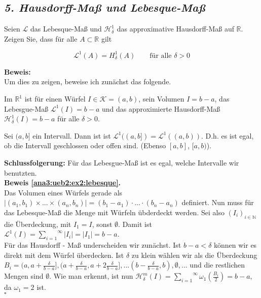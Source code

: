 \subsection*{\itshape 5. Hausdorff-Maß und Lebesque-Maß}

Seien $\mathcal{L}$ das Lebesque-Maß und $\mathcal{H}^1_\delta$ das approximative Hausdorff-Maß auf $\mathbb{R}$. Zeigen Sie,
dass für alle $A \subset \mathbb{R}$ gilt

$$
    \mathcal{L}^1(A) = H^1_\delta(A) \qquad \text{für alle }\delta > 0
$$

\textbf{Beweis:}\\

Um dies zu zeigen, beweise ich zunächst das folgende.

\begin{lemma}\label{ana3:ueb2:ex2:lebesque}
    Im $\mathbb{R}^1$ ist für einen Würfel $I \in \mathcal{K} = (a,b)$, sein Volumen $I = b - a$, das Lebesgue-Maß $\mathcal{L}^1 (I) = b - a$
    und das approximierte Hausdorff-Maß $\mathcal{H}^1_\delta (I) = b - a$ für alle $\delta > 0$.
\end{lemma}

\begin{lemma}\label{ana3:ueb3:ex2:offen}
    Sei $(a,b]$ ein Intervall. Dann ist ist $\mathcal{L}^1 ((a,b]) = \mathcal{L}^1 ((a,b))$. D.h. es ist egal, ob
    die Intervall geschlossen oder offen sind. (Ebenso $[a,b]$, $[a,b)$).
\end{lemma}

\textbf{Schlussfolgerung:} Für das Lebesgue-Maß ist es egal, welche Intervalle wir benutzten.\\

\textbf{Beweis \ref{ana3:ueb2:ex2:lebesque}.}\\

Das Volumen eines Würfels gerade als $| (a_1,b_1)\times ... \times (a_n,b_n)| = (b_1 - a_1) \cdot ... \cdot (b_n - a_n)$ definiert.
Nun muss für das Lebesque-Maß die Menge mit Würfeln übderdeckt werden. Sei also $(I_i)_{i \in \mathbb{N}}$ die Überdeckung, mit $I_1 = I$, sonst $\emptyset$.
Damit ist $\mathcal{L}^1 (I) = \overset{\infty}{\underset{i=1}{\sum}} |I_i| = |I_1| = b - a$.\\

Für das Hausdorff - Maß underscheiden wir zunächst. Ist $b - a < \delta$ können wir es direkt mit dem Würfel überdecken. Ist $\delta$ zu klein wählen wir als 
die Überdeckung $B_i = (a, a+ \frac{\delta}{b-a}], (a + \frac{\delta}{b-a}, a + 2 \frac{\delta}{b-a}], ... (b - \frac{\delta}{b-a}, b), \emptyset, ...$ und die restlichen
Mengen sind $\emptyset$. Wie man erkennt, ist nun $\mathcal{H}^m_\delta (I) = \overset{\infty}{\underset{i=1}{\sum}} \omega_1 \left(\frac{B_i}{2} \right) = b - a$, da
$\omega_1 = 2$ ist.\\
\mbox{} \hfill $\square$\\

